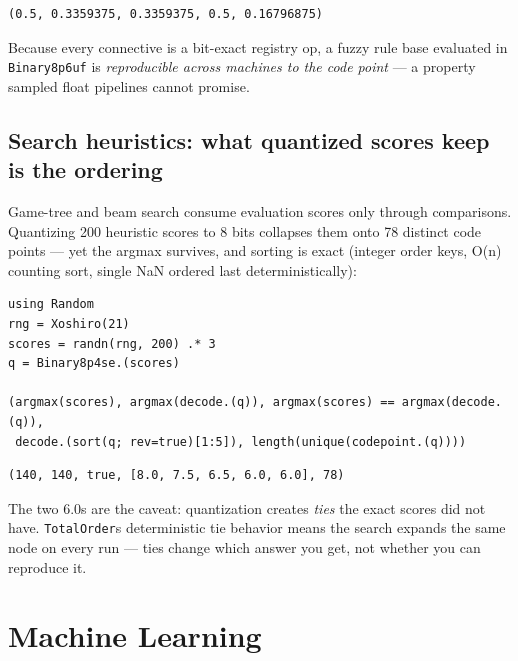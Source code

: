 \begin{verbatim}
(0.5, 0.3359375, 0.3359375, 0.5, 0.16796875)
\end{verbatim}



Because every connective is a bit-exact registry op, a fuzzy rule base evaluated in \texttt{Binary8p6uf} is \emph{reproducible across machines to the code point} — a property sampled float pipelines cannot promise.



\subsection{Search heuristics: what quantized scores keep is the ordering}



\label{18015521726916863751}{}


Game-tree and beam search consume evaluation scores only through comparisons. Quantizing 200 heuristic scores to 8 bits collapses them onto 78 distinct code points — yet the argmax survives, and sorting is exact (integer order keys, O(n) counting sort, single NaN ordered last deterministically):




\begin{verbatim}
using Random
rng = Xoshiro(21)
scores = randn(rng, 200) .* 3
q = Binary8p4se.(scores)

(argmax(scores), argmax(decode.(q)), argmax(scores) == argmax(decode.(q)),
 decode.(sort(q; rev=true)[1:5]), length(unique(codepoint.(q))))
\end{verbatim}




\begin{verbatim}
(140, 140, true, [8.0, 7.5, 6.5, 6.0, 6.0], 78)
\end{verbatim}



The two 6.0s are the caveat: quantization creates \emph{ties} the exact scores did not have. \texttt{TotalOrder}{\textquotesingle}s deterministic tie behavior means the search expands the same node on every run — ties change which answer you get, not whether you can reproduce it.



\section{Machine Learning}



